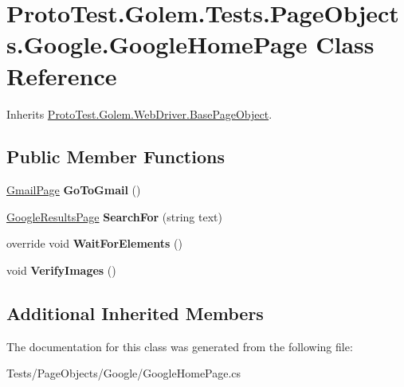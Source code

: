 \hypertarget{class_proto_test_1_1_golem_1_1_tests_1_1_page_objects_1_1_google_1_1_google_home_page}{\section{Proto\-Test.\-Golem.\-Tests.\-Page\-Objects.\-Google.\-Google\-Home\-Page Class Reference}
\label{class_proto_test_1_1_golem_1_1_tests_1_1_page_objects_1_1_google_1_1_google_home_page}
}


Inherits \hyperlink{class_proto_test_1_1_golem_1_1_web_driver_1_1_base_page_object}{Proto\-Test.\-Golem.\-Web\-Driver.\-Base\-Page\-Object}.

\subsection*{Public Member Functions}
\begin{DoxyCompactItemize}
\item 
\hypertarget{class_proto_test_1_1_golem_1_1_tests_1_1_page_objects_1_1_google_1_1_google_home_page_a089f9b6c81329ee660f9479505e51f57}{\hyperlink{class_proto_test_1_1_golem_1_1_tests_1_1_page_objects_1_1_google_1_1_gmail_page}{Gmail\-Page} {\bfseries Go\-To\-Gmail} ()}\label{class_proto_test_1_1_golem_1_1_tests_1_1_page_objects_1_1_google_1_1_google_home_page_a089f9b6c81329ee660f9479505e51f57}

\item 
\hypertarget{class_proto_test_1_1_golem_1_1_tests_1_1_page_objects_1_1_google_1_1_google_home_page_a1b8cbb7bce6010655b279ce5b31313d9}{\hyperlink{class_proto_test_1_1_golem_1_1_tests_1_1_page_objects_1_1_google_1_1_google_results_page}{Google\-Results\-Page} {\bfseries Search\-For} (string text)}\label{class_proto_test_1_1_golem_1_1_tests_1_1_page_objects_1_1_google_1_1_google_home_page_a1b8cbb7bce6010655b279ce5b31313d9}

\item 
\hypertarget{class_proto_test_1_1_golem_1_1_tests_1_1_page_objects_1_1_google_1_1_google_home_page_a3e9048a9e59ad401c98664705d10d343}{override void {\bfseries Wait\-For\-Elements} ()}\label{class_proto_test_1_1_golem_1_1_tests_1_1_page_objects_1_1_google_1_1_google_home_page_a3e9048a9e59ad401c98664705d10d343}

\item 
\hypertarget{class_proto_test_1_1_golem_1_1_tests_1_1_page_objects_1_1_google_1_1_google_home_page_a68e556310522c3d5da114e4c80eb4513}{void {\bfseries Verify\-Images} ()}\label{class_proto_test_1_1_golem_1_1_tests_1_1_page_objects_1_1_google_1_1_google_home_page_a68e556310522c3d5da114e4c80eb4513}

\end{DoxyCompactItemize}
\subsection*{Additional Inherited Members}


The documentation for this class was generated from the following file\-:\begin{DoxyCompactItemize}
\item 
Tests/\-Page\-Objects/\-Google/Google\-Home\-Page.\-cs\end{DoxyCompactItemize}
